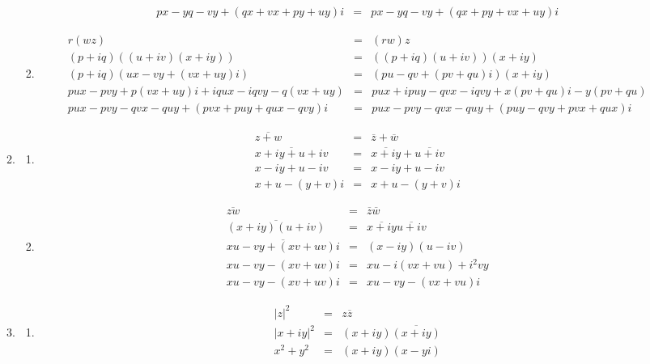 \documentclass{article}%
\newcommand\abs[1]{\left|#1\right|}
\begin{document}
\begin{enumerate}
\begin{enumerate}[label*=\arabic*.]
\begin{enumerate}[label=\alph*]
\begin{eqnarray*}
            px-yq-vy+(qx+vx+py+uy)i&=&px-yq-vy+(qx+py+vx+uy)i
        \end{eqnarray*}
        \item \begin{eqnarray*}
            r(wz)&=&(rw)z \\
            (p+iq)((u+iv)(x+iy))&=&((p+iq)(u+iv))(x+iy) \\
            (p+iq)(ux-vy+(vx+uy)i)&=&(pu-qv+(pv+qu)i)(x+iy) \\
            pux-pvy+p(vx+uy)i+iqux-iqvy-q(vx+uy)&=&pux+ipuy-qvx-iqvy+x(pv+qu)i-y(pv+qu) \\
            pux-pvy-qvx-quy+(pvx+puy+qux-qvy)i&=&pux-pvy-qvx-quy+(puy-qvy+pvx+qux)i
       \end{eqnarray*}
    \end{enumerate}
    \item
    \begin{enumerate}[label=\alph*]
        \item \begin{eqnarray*}
            \overline{z+w}&=&\overline{z}+\overline{w} \\
            \overline{x+iy+u+iv}&=&\overline{x+iy}+\overline{u+iv} \\
            x-iy+u-iv&=&x-iy+u-iv \\
            x+u-(y+v)i&=&x+u-(y+v)i
        \end{eqnarray*}
        \item
        \begin{eqnarray*}
            \overline{zw}&=&\overline{z}\overline{w} \\
            \overline{(x+iy)(u+iv)}&=&\overline{x+iy}\overline{u+iv} \\
            \overline{xu-vy+(xv+uv)i}&=&(x-iy)(u-iv) \\
            xu-vy-(xv+uv)i&=&xu-i(vx+vu)+i^2vy \\
            xu-vy-(xv+uv)i&=&xu-vy-(vx+vu)i
        \end{eqnarray*}
    \end{enumerate}
    \item
    \begin{enumerate}[label=\alph*]
        \item \begin{eqnarray*}
            \abs{z}^2&=&z\overline{z} \\
            \abs{x+iy}^2&=&(x+iy)\overline{(x+iy)} \\
            x^2+y^2&=&(x+iy)(x-yi) \\

\end{eqnarray*}
\end{enumerate}
\end{enumerate}
\end{enumerate}
\end{document}
